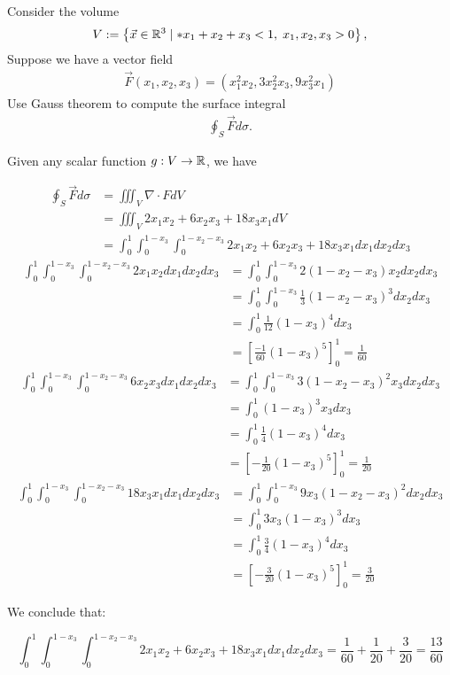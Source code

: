 \documentclass[11pt]{article}
\begin{document}
\begin{exercise}
    Consider the volume 
    \begin{align}
     V := \left\{ \vec x \in \bbR^3 \suchthat* x_1 + x_2 + x_3 < 1, \; x_1, x_2, x_3 > 0 \right\},
    \end{align}
    Suppose we have a vector field 
    \begin{align}
        \vec F(x_1,x_2,x_3) = \left( x_1^2 x_2, 3 x_2^{2} x_3, 9 x_3^{2} x_1 \right)
    \end{align}
    Use Gauss theorem to compute the surface integral 
    \begin{align}
        \oint_{S} \vec F d\sigma.
    \end{align}
\end{exercise}
\begin{solution}     
    Given any scalar function $g : V \to \mathbb{R}$, we have 

    \begin{align*}
        \oint_{S} \vec F d\sigma & = \iiint_V \nabla \cdot F dV\\
		&= \iiint_V 2x_1x_2 + 6x_2x_3 + 18x_3x_1 dV\\
		&= \int_{0}^{1}\int_{0}^{1 - x_3}\int_{0}^{1 - x_2 - x_3} 2x_1x_2 + 6x_2x_3 + 18x_3x_1 dx_1 dx_2 dx_3
    \end{align*}
    \begin{align*}
        \int_{0}^{1}\int_{0}^{1 - x_3}\int_{0}^{1 - x_2 - x_3} 2x_1x_2 dx_1 dx_2 dx_3 &= \int_{0}^{1}\int_{0}^{1 - x_3} 2(1-x_2-x_3)x_2 dx_2 dx_3\\
	&= \int_{0}^{1}\int_{0}^{1 - x_3} \frac{1}{3}(1-x_2-x_3)^3 dx_2 dx_3\\
	&= \int_{0}^{1} \frac{1}{12}(1-x_3)^4 dx_3\\
	&= \left[ \frac{-1}{60}(1-x_3)^5\right]_0^1 = \frac{1}{60}
    \end{align*}
    \begin{align*}
        \int_{0}^{1}\int_{0}^{1 - x_3}\int_{0}^{1 - x_2 - x_3} 6x_2x_3  dx_1 dx_2 dx_3 &= \int_{0}^{1}\int_{0}^{1 - x_3} 3(1 - x_2 - x_3)^2 x_3   dx_2 dx_3 \\
	&= \int_{0}^{1} (1 - x_3)^3 x_3   dx_3 \\
	&= \int_{0}^{1} \frac{1}{4}(1 - x_3)^4  dx_3 \\
	&= \left[-\frac{1}{20}(1 - x_3)^5 \right]_0^1 = \frac{1}{20}
    \end{align*}
	\begin{align*}
         \int_{0}^{1}\int_{0}^{1 - x_3}\int_{0}^{1 - x_2 - x_3} 18x_3x_1 dx_1 dx_2 dx_3&= \int_{0}^{1}\int_{0}^{1 - x_3} 9x_3(1-x_2-x_3)^2   dx_2 dx_3 \\
	&=\int_{0}^{1} 3x_3(1-x_3)^3  dx_3 \\
	&= \int_{0}^{1} \frac{3}{4}(1-x_3)^4  dx_3 \\
	&= \left[-\frac{3}{20}(1-x_3)^5  \right]_0^1 =\frac{3}{20}
    \end{align*}

We conclude that:

$$
\int_{0}^{1}\int_{0}^{1 - x_3}\int_{0}^{1 - x_2 - x_3} 2x_1x_2 + 6x_2x_3 + 18x_3x_1 dx_1 dx_2 dx_3 = \frac{1}{60} + \frac{1}{20} + \frac{3}{20} = \frac{13}{60}
$$
\end{solution}
\end{document}
